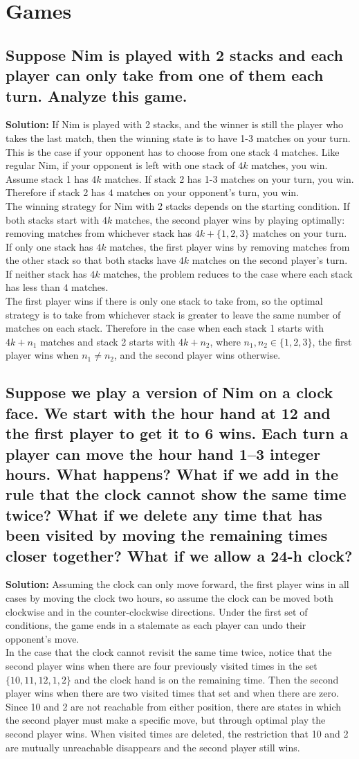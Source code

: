 \documentclass{article}
\newcommand{\exercise}[1]{\subsection{\normalfont #1}}
\newcommand{\solution}{\indent\indent \textbf{Solution: }}
\begin{document}
 \section{Games}
 \exercise{Suppose Nim is played with 2 stacks and each player can only take from one of them each turn. Analyze this game.} %
 \solution If Nim is played with 2 stacks, and the winner is still the player who takes the last match, then the winning state is to have 1-3 matches on your turn. This is the case if your opponent has to choose from one stack 4 matches. Like regular Nim, if your opponent is left with one stack of $4k$ matches, you win. Assume stack 1 has $4k$ matches. If stack 2 has 1-3 matches on your turn, you win. Therefore if stack 2 has $4$ matches on your opponent's turn, you win. \\
 \indent The winning strategy for Nim with 2 stacks depends on the starting condition. If both stacks start with $4k$ matches, the second player wins by playing optimally: removing matches from whichever stack has $4k+ \{1, 2 , 3\}$ matches on your turn. If only one stack has $4k$ matches, the first player wins by removing matches from the other stack so that both stacks have $4k$ matches on the second player's turn. If neither stack has $4k$ matches, the problem reduces to the case where each stack has less than $4$ matches. \\
 \indent The first player wins if there is only one stack to take from, so the optimal strategy is to take from whichever stack is greater to leave the same number of matches on each stack. Therefore in the case when each stack 1 starts with $4k+n_1$ matches and stack 2 starts with $4k+n_2$, where $n_1, n_2 \in \{1,2,3\}$, the first player wins when $n_1\neq n_2$, and the second player wins otherwise. 
 \exercise{Suppose we play a version of Nim on a clock face. We start with the hour hand at 12 and the first player to get it to 6 wins. Each turn a player can move the hour hand 1–3 integer hours. What happens? What if we add in the rule that the clock cannot show the same time twice? What if we delete any time that has been visited by moving the remaining times closer together? What if we allow a 24-h clock?} %
 \solution Assuming the clock can only move forward, the first player wins in all cases by moving the clock two hours, so assume the clock can be moved both clockwise and in the counter-clockwise directions. Under the first set of conditions, the game ends in a stalemate as each player can undo their opponent's move.\\
 \indent In the case that the clock cannot revisit the same time twice, notice that the second player wins when there are four previously visited times in the set $\{10, 11, 12, 1, 2\}$ and the clock hand is on the remaining time. Then the second player wins when there are two visited times that set and when there are zero. Since 10 and 2 are not reachable from either position, there are states in which the second player must make a specific move, but through optimal play the second player wins. When visited times are deleted, the restriction that 10 and 2 are mutually unreachable disappears and the second player still wins. \\
\end{document}
